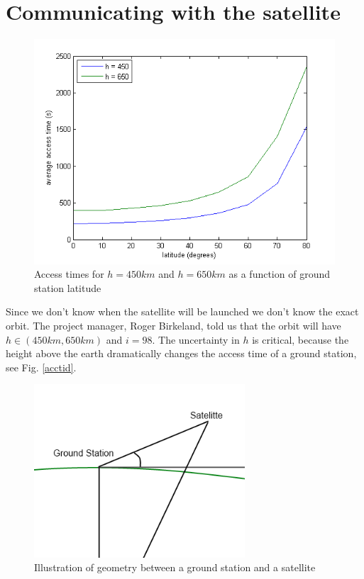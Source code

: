 
\section{Communicating with the satellite}

\begin{figure}
  \begin{center}
    \includegraphics[width=1.0\textwidth]{Figures/accesstid450og650}
  \end{center}
  \caption[Accesstid for 450 og 650]{Access times for $h=450km$ and $h=650km$ as a function of ground station latitude}
  \label{fig:acctid}
\end{figure}

Since we don't know when the satellite will be launched we don't know the exact orbit. The project manager, Roger Birkeland, told us that the orbit will have $h\in (450km,650km)$ and $i=98$. The uncertainty in $h$ is critical, because the height above the earth dramatically changes the access time of a ground station, see Fig. \ref{acctid}. 

\begin{figure}
  \begin{center}
    \includegraphics[width=0.7\textwidth]{Figures/groundstation_satelitte_geometry}
  \end{center}
  \caption[Ground station satellite geometry]{Illustration of geometry between a ground station and a satellite}
  \label{fig:gs_s_geom}
\end{figure}

